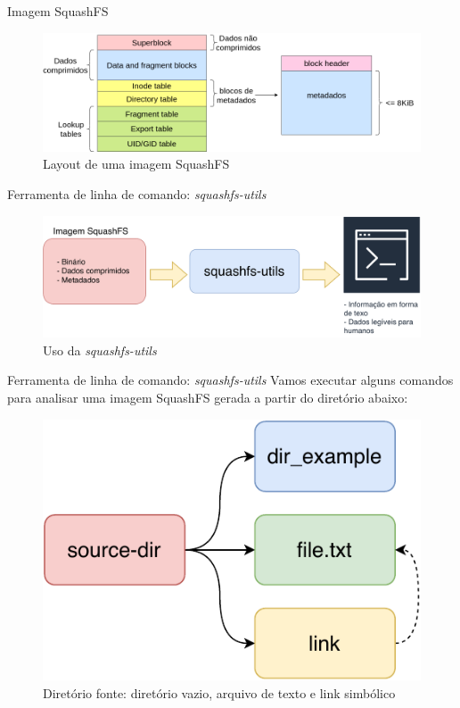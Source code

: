 \begin{frame}{Imagem SquashFS}
    \begin{figure}
        \centering
        \includegraphics[scale=0.32]{figuras/sqfs.png}
        \caption{Layout de uma imagem SquashFS}
        \label{fig:my_label}
    \end{figure}
\end{frame}

\begin{frame}{Ferramenta de linha de comando: \textit{squashfs-utils}}
    \begin{figure}
        \centering
        \includegraphics[scale=0.4]{figuras/sqfsutils.pdf}
        \caption{Uso da \textit{squashfs-utils}}
        \label{fig:my_label}
    \end{figure}
\end{frame}

\begin{frame}{Ferramenta de linha de comando: \textit{squashfs-utils}}
Vamos executar alguns comandos para analisar uma imagem SquashFS gerada a partir do diretório abaixo:
\begin{figure}
    \centering
    \includegraphics[scale=0.7]{figuras/tree.pdf}
    \caption{Diretório fonte: diretório vazio, arquivo de texto e link simbólico}
    \label{fig:my_label}
\end{figure}
\end{frame}



